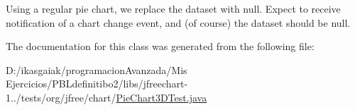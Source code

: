 Using a regular pie chart, we replace the dataset with null. Expect to receive notification of a chart change event, and (of course) the dataset should be null. 

The documentation for this class was generated from the following file\+:\begin{DoxyCompactItemize}
\item 
D\+:/ikasgaiak/programacion\+Avanzada/\+Mis Ejercicios/\+P\+B\+Ldefinitibo2/libs/jfreechart-\/1../tests/org/jfree/chart/\mbox{\hyperlink{_pie_chart3_d_test_8java}{Pie\+Chart3\+D\+Test.\+java}}\end{DoxyCompactItemize}

